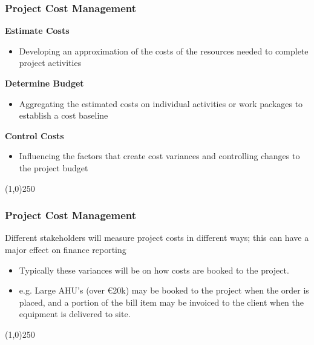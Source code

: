 \begin{frame}
\frametitle{Project Cost Management}
\textbf{Estimate Costs}
\begin{itemize}
	\item Developing an approximation of the costs of the resources needed to complete project activities
\end{itemize}
\textbf{Determine Budget}
\begin{itemize}
	\item Aggregating the estimated costs on individual activities or work packages to establish a cost baseline
\end{itemize}
\textbf{Control Costs}
\begin{itemize}
	\item Influencing the factors that create cost variances and controlling changes to the project budget
\end{itemize}
\end{frame}
\begin{center}\line(1,0){250}\end{center}





\begin{frame}
\frametitle{Project Cost Management}
Different stakeholders will measure project costs in different ways; this can have a major effect on finance reporting
\begin{itemize}
	\item Typically these variances will be on how costs are booked to the project.

	\item e.g. Large AHU's (over \euro20k) may be booked to the project when the order is placed, and a portion of the bill item may be invoiced to the client when the equipment is delivered to site.
\end{itemize}
\end{frame}
\begin{center}\line(1,0){250}\end{center}







